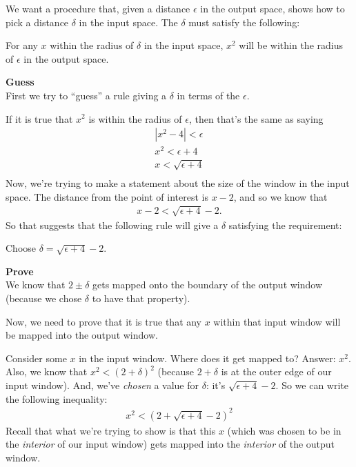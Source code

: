 \begin{mdframed}
  We want a procedure that, given a distance $\epsilon$ in the output space,
  shows how to pick a distance $\delta$ in the input space. The $\delta$ must satisfy the following:

  For any $x$ within the radius of $\delta$ in the input space, $x^2$ will be
  within the radius of $\epsilon$ in the output space.

  \textbf{Guess}\\
  First we try to ``guess'' a rule giving a $\delta$ in terms of the $\epsilon$.

  If it is true that $x^2$ is within the radius of $\epsilon$, then that's the
  same as saying
  \begin{align*}
    |x^2 - 4| < \epsilon\\
    x^2 < \epsilon + 4\\
    x < \sqrt{\epsilon + 4}\\
  \end{align*}
  Now, we're trying to make a statement about the size of the window in the
  input space. The distance from the point of interest is $x - 2$, and so we
  know that
  \begin{align*}
    x - 2 < \sqrt{\epsilon + 4} - 2.
  \end{align*}
  So that suggests that the following rule will give a $\delta$ satisfying the
  requirement:

  Choose $\delta = \sqrt{\epsilon + 4} - 2$.

  \textbf{Prove}\\
  We know that $2 \pm \delta$ gets mapped onto the boundary of the output
  window (because we chose $\delta$ to have that property).

  Now, we need to prove that it is true that any $x$ within that input window
  will be mapped into the output window.

  Consider some $x$ in the input window. Where does it get mapped to? Answer:
  $x^2$. Also, we know that $x^2 < (2 + \delta)^2$ (because $2+\delta$ is at
  the outer edge of our input window). And, we've \textit{chosen} a value for
  $\delta$: it's $\sqrt{\epsilon + 4} - 2$. So we can write the following
  inequality:
  \begin{align*}
    x^2 < (2 + \sqrt{\epsilon + 4} - 2)^2
  \end{align*}
  Recall that what we're trying to show is that this $x$ (which was chosen to
  be in the \textit{interior} of our input window) gets mapped into the
  \textit{interior} of the output window.


\end{mdframed}
